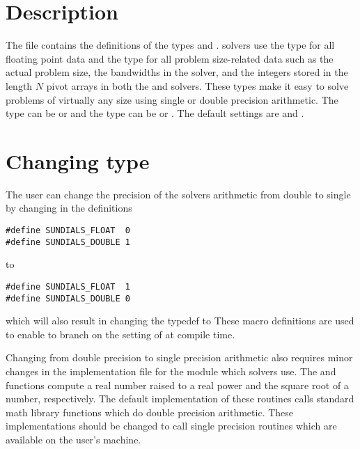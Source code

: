 %
\section{Description}

The  file contains the definitions of the types  and
. {\sundials} solvers use the type  for all floating point data and
the type  for all problem size-related data such as the actual
problem size, the bandwidths in the {\band} solver, and the integers
stored in the length $N$ pivot arrays in both the {\dense} and {\band} solvers.
These types make it easy to solve problems of virtually any size
using single or double precision arithmetic. The type  can be
 or  and the type  can be  or
. The default settings are  and .

\section{Changing type }

The user can change the precision of the {\sundials} solvers arithmetic from double to single
by changing in  the definitions
\begin{verbatim}
#define SUNDIALS_FLOAT  0
#define SUNDIALS_DOUBLE 1
\end{verbatim}
to
\begin{verbatim}
#define SUNDIALS_FLOAT  1
#define SUNDIALS_DOUBLE 0
\end{verbatim}
which will also result in changing the typedef  to 
These macro definitions are used to enable  to branch on
the setting of  at compile time. 

Changing from double precision to single precision arithmetic also
requires minor changes in the implementation file  for
the {\sundialsmath} module which {\sundials} solvers use. The  and
 functions compute a real number raised to a real power and the
square root of a number, respectively. The default implementation of
these routines calls standard {\C} math library functions which do double
precision arithmetic. These implementations should be changed to call
single precision routines which are available on the user's machine.

